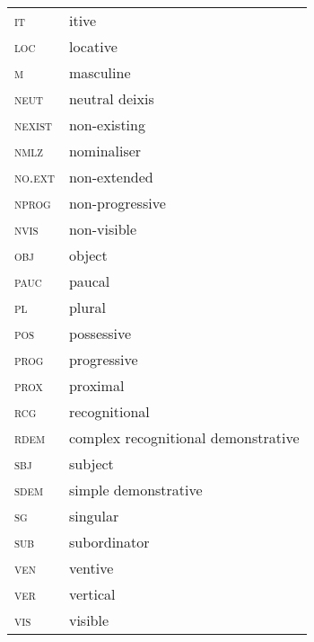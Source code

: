 \documentclass[output=paper,colorlinks,citecolor=brown]{langscibook}
\begin{document}
\begin{tabularx}{.45\textwidth}{lQ}
\textsc{it} & itive\\
\textsc{loc} & locative\\
\textsc{m} & masculine\\
\textsc{neut} & neutral deixis\\
\textsc{nexist} & non-existing\\
\textsc{nmlz} & nominaliser\\
\textsc{no.ext} & non-extended\\
\textsc{nprog} & non-progressive\\
\textsc{nvis} & non-visible\\
\textsc{obj} & object\\
\textsc{pauc} & paucal\\
\textsc{pl} & plural\\
\textsc{pos} & possessive\\
\textsc{prog} & progressive\\
\textsc{prox} & proximal\\
\textsc{rcg} & recognitional\\
\textsc{rdem} & complex recognitional demonstrative\\
\textsc{sbj} & subject\\
\textsc{sdem} & simple demonstrative\\
\textsc{sg} & singular\\
\textsc{sub} & subordinator\\
\textsc{ven} & ventive\\
\textsc{ver} & vertical\\
\textsc{vis} & visible\\
\end{tabularx}

\sloppy\printbibliography[heading=subbibliography,notkeyword=this]
\end{document}
